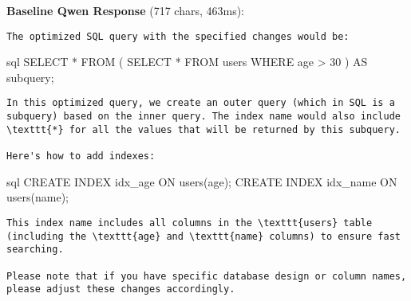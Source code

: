 \documentclass[11pt,a4paper]{article}
\begin{document}
\textbf{Baseline Qwen Response} (717 chars, 463ms):
\begin{verbatim}The optimized SQL query with the specified changes would be:

\end{verbatim}sql
SELECT *
FROM (
    SELECT 
        * 
    FROM users
    WHERE age > 30
) AS subquery;
\begin{verbatim}
In this optimized query, we create an outer query (which in SQL is a subquery) based on the inner query. The index name would also include \texttt{*} for all the values that will be returned by this subquery.

Here's how to add indexes:

\end{verbatim}sql
CREATE INDEX idx_age ON users(age);
CREATE INDEX idx_name ON users(name);
\begin{verbatim}
This index name includes all columns in the \texttt{users} table (including the \texttt{age} and \texttt{name} columns) to ensure fast searching. 

Please note that if you have specific database design or column names, please adjust these changes accordingly.
\end{verbatim}
\end{document}
